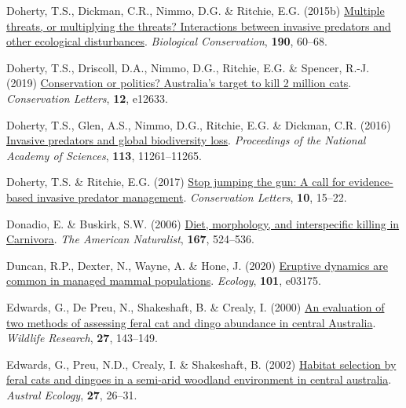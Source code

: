 \documentclass[11pt,a4paper,titlepage,twoside,openright]{style/unimelbthesis}
\newenvironment{CSLReferences}%
  {}%
  {\par}
\begin{document}
\begin{mainmatter}
\begin{CSLReferences}{1}{0}
\leavevmode{}%
Doherty, T.S., Dickman, C.R., Nimmo, D.G. \& Ritchie, E.G. (2015b) \href{https://doi.org/10.1016/j.biocon.2015.05.013}{Multiple threats, or multiplying the threats? Interactions between invasive predators and other ecological disturbances}. \emph{Biological Conservation}, \textbf{190}, 60--68.

\leavevmode{}%
Doherty, T.S., Driscoll, D.A., Nimmo, D.G., Ritchie, E.G. \& Spencer, R.-J. (2019) \href{https://doi.org/10.1111/conl.12633}{Conservation or politics? {{A}ustralia's} target to kill 2 million cats}. \emph{Conservation Letters}, \textbf{12}, e12633.

\leavevmode{}%
Doherty, T.S., Glen, A.S., Nimmo, D.G., Ritchie, E.G. \& Dickman, C.R. (2016) \href{https://doi.org/10.1073/pnas.1602480113}{Invasive predators and global biodiversity loss}. \emph{Proceedings of the National Academy of Sciences}, \textbf{113}, 11261--11265.

\leavevmode{}%
Doherty, T.S. \& Ritchie, E.G. (2017) \href{https://doi.org/10.1111/conl.12251}{Stop jumping the gun: A call for evidence-based invasive predator management}. \emph{Conservation Letters}, \textbf{10}, 15--22.

\leavevmode{}%
Donadio, E. \& Buskirk, S.W. (2006) \href{https://doi.org/10.1086/501033}{Diet, morphology, and interspecific killing in {C}arnivora}. \emph{The American Naturalist}, \textbf{167}, 524--536.

\leavevmode{}%
Duncan, R.P., Dexter, N., Wayne, A. \& Hone, J. (2020) \href{https://doi.org/10.1002/ecy.3175}{Eruptive dynamics are common in managed mammal populations}. \emph{Ecology}, \textbf{101}, e03175.

\leavevmode{}%
Edwards, G., De Preu, N., Shakeshaft, B. \& Crealy, I. (2000) \href{https://doi.org/10.1071/WR98067}{An evaluation of two methods of assessing feral cat and dingo abundance in central {{A}ustralia}}. \emph{Wildlife Research}, \textbf{27}, 143--149.

\leavevmode{}%
Edwards, G., Preu, N.D., Crealy, I. \& Shakeshaft, B. (2002) \href{https://doi.org/10.1046/j.1442-9993.2002.01156.x}{Habitat selection by feral cats and dingoes in a semi-arid woodland environment in central australia}. \emph{Austral Ecology}, \textbf{27}, 26--31.


\end{CSLReferences}
\end{mainmatter}
\end{document}
